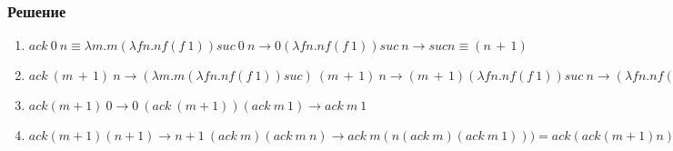 \documentclass[10pt,a4paper]{article}
\begin{document}
\subsubsection*{Решение}
\begin{enumerate}
\item
$ack\ 0\ n \equiv \lambda m.m(\lambda fn.nf(f\ 1))suc\ 0\ n \rightarrow
0(\lambda fn.nf(f\ 1))suc\ n \rightarrow suc n \equiv (n\,+\,1)$
\item
$ack\ (m\,+\,1)\ n \rightarrow (\lambda m.m(\lambda fn.nf(f\ 1))suc)\
(m\,+\,1)\ n \rightarrow (m\,+\,1)(\lambda fn.nf(f\ 1))suc\ n
\rightarrow (\lambda fn.nf(f\ 1))(m\ \lambda fn.nf(f\ 1) suc) n = (\lambda
fn.nf(f\ 1))(ack\ m) n \rightarrow n(ack\ m)(ack\ m\ 1) $ 
\item
$ ack (m+1)\ 0 \rightarrow 0\ (ack\ (m+1)) (ack\ m\ 1) \rightarrow ack\
m\ 1  $
\item
$ack(m+1)(n+1) \rightarrow n+1\ (ack\ m)(ack\ m\ n) \rightarrow ack\
m(n(ack\ m)(ack\ m\ 1))) = ack (ack(m+1)n)$
\end{enumerate}
\end{document}
